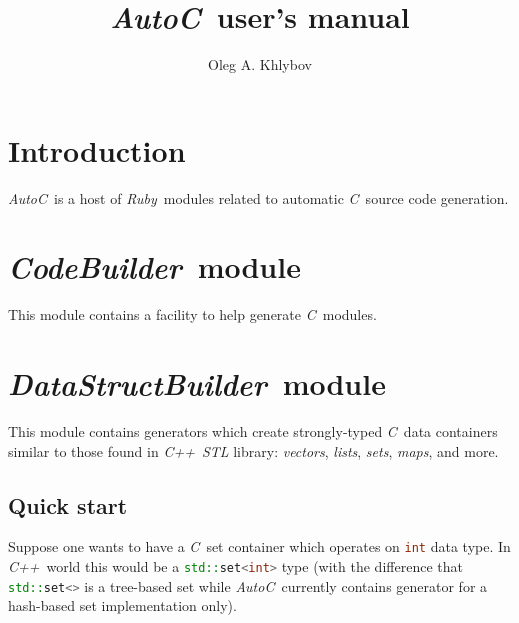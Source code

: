 \documentclass[a4paper]{article}
\newcommand{\autoc}{\emph{AutoC}}
\newcommand{\R}{\emph{Ruby}}
\newcommand{\C}{\emph{C}}
\newcommand{\Cpp}{\emph{C++}}
\begin{document}
\title{\autoc\ user's manual}
\author{Oleg A. Khlybov}


\maketitle


\section{Introduction}


\autoc\ is a host of \R\ modules related to automatic \C\ source code generation.


\newcommand{\codebuilder}{\emph{CodeBuilder}}
\section{\codebuilder\ module}


This module contains a facility to help generate \C\ modules.


\newcommand{\datastructbuilder}{\emph{DataStructBuilder}}
\section{\datastructbuilder\ module}


This module contains generators which create strongly-typed \C\ data containers similar to those found in \Cpp\ \emph{STL} library: \emph{vectors}, \emph{lists}, \emph{sets}, \emph{maps}, and more.


\subsection{Quick start}


Suppose one wants to have a \C\ set container which operates on \lstinline[language=C++]{int} data type.
In \Cpp\ world this would be a \lstinline[language=C++]{std::set<int>} type (with the difference that \lstinline[language=C++]{std::set<>} is a tree-based set while \autoc\ currently contains generator for a hash-based set implementation only).
\end{document}
